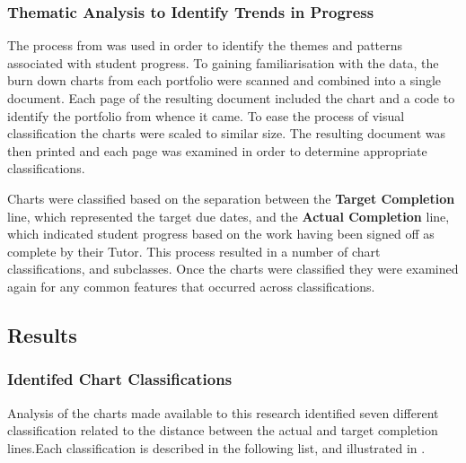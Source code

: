 
\subsubsection{Thematic Analysis to Identify Trends in Progress} %
\label{sub:approach_to_analysis}

The process from  was used in order to identify the themes and patterns associated with student progress. To gaining familiarisation with the data, the burn down charts from each portfolio were scanned and combined into a single document. Each page of the resulting document included the chart and a code to identify the portfolio from whence it came. To ease the process of visual classification the charts were scaled to similar size. The resulting document was then printed and each page was examined in order to determine appropriate classifications. 

Charts were classified based on the separation between the \textbf{Target Completion} line, which represented the target due dates, and the \textbf{Actual Completion} line, which indicated student progress based on the work having been signed off as complete by their Tutor. This process resulted in a number of chart classifications, and subclasses. Once the charts were classified they were examined again for any common features that occurred across classifications. 


\subsection{Results} %
\label{sec:progress_results}

\subsubsection{Identifed Chart Classifications} %
\label{sub:identified_chart_classifications}

Analysis of the charts made available to this research identified seven different classification related to the distance between the actual and target completion lines.Each classification is described in the following list, and illustrated in .


